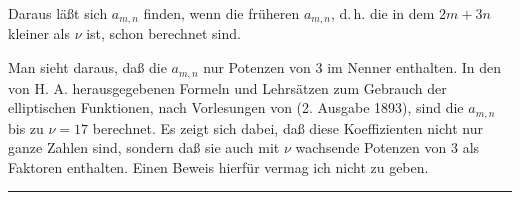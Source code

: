 
Daraus läßt sich $a_{m,n}$ finden, wenn die früheren $a_{m,n}$,
d.\,h. die in dem $2m+3n$ kleiner als $\nu$ ist, schon berechnet
sind.

Man sieht daraus, daß die $a_{m,n}$ nur Potenzen von 3 im Nenner
enthalten. In den von H. A.  herausgegebenen
\glqq Formeln und Lehrsätzen zum Gebrauch der elliptischen
Funktionen\grqq, nach Vorlesungen von 
(2. Ausgabe 1893), sind die $a_{m,n}$ bis zu $\nu=17$ berechnet. Es
zeigt sich dabei, daß diese Koeffizienten nicht nur ganze Zahlen
sind, sondern daß sie auch mit $\nu$ wachsende Potenzen von 3 als
Faktoren enthalten. Einen Beweis hierfür vermag ich nicht zu geben.

\begin{center}
\rule{2cm}{0.4pt}
\end{center}
